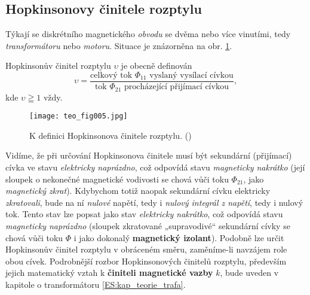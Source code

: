 {    \subsection{Hopkinsonovy činitele rozptylu}
      Týkají se diskrétního magnetického \emph{obvodu} se dvěma nebo více vinutími, tedy 
      \emph{transformátoru} nebo \emph{motoru}. Situace je znázorněna na obr. \ref{teo:fig005}.
      
      Hopkinsonův činitel rozptylu \(\upsilon\) je obecně definován 
      \begin{equation}  \label{TEO:eq013}
        \upsilon = \frac{\text{celkový tok \(\Phi_{11}\) vyslaný vysílací cívkou}}{\text{tok 
        \(\Phi_{21}\) procházející přijímací cívkou}},
      \end{equation}
      kde \(\upsilon\geqq1\) vždy.
      
      \begin{figure}[ht!]  %
        \centering
        \texttt{[image: teo\_fig005.jpg]}
        \caption{K definici Hopkinsonova činitele rozptylu.
                (\cite[s.~153]{Patocka4})}
        \label{teo:fig005}
      \end{figure}
      Vidíme, že při určování Hopkinsonova činitele musí být sekundární (přijímací) cívka ve stavu 
      \emph{elektricky naprázdno}, což odpovídá stavu \emph{magneticky nakrátko} (její sloupek o 
      nekonečné magnetické vodivosti se chová vůči toku \(\Phi_{21}\), jako \emph{magnetický 
      zkrat}). Kdybychom totiž naopak sekundární cívku elektricky \emph{zkratovali}, bude na ní 
      \emph{nulové} napětí, tedy i\emph{ nulový integrál z napětí}, tedy i nulový tok. Tento stav 
      lze popsat jako stav \emph{elektricky nakrátko}, což odpovídá stavu \emph{magneticky 
      naprázdno} (sloupek zkratované „supravodivé“ sekundární cívky se chová vůči toku \(\Phi\) i 
      jako dokonalý \textbf{magnetický izolant}). Podobně lze určit Hopkinsonův činitel rozptylu v 
      obráceném směru, zaměníme-li navzájem role obou cívek. Podrobnější rozbor Hopkinsonových 
      činitelů rozptylu, především jejich matematický vztah k \textbf{činiteli magnetické vazby} 
      \(k\), bude uveden v kapitole o transformátoru \ref{ES:kap_teorie_trafa}.
       
}
